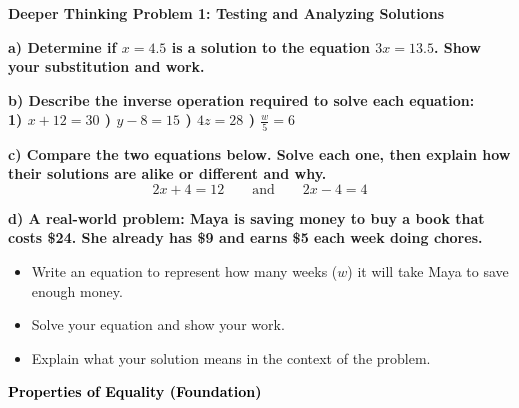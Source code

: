 \documentclass[12pt, letterpaper, fleqn]{article}
\begin{document}
\vspace{2mm}

\begin{tcolorbox}[colback=white, colframe=black, boxrule=1pt, arc=4mm, left=6mm, right=6mm, top=5mm, bottom=5mm]
\textbf{Deeper Thinking Problem 1: Testing and Analyzing Solutions}
\medskip
\noindent

\textbf{a) Determine if $x = 4.5$ is a solution to the equation $3x = 13.5$. Show your substitution and work.}
\vspace{2cm}
\noindent

\textbf{b) Describe the inverse operation required to solve each equation: \\
1) $x + 12 = 30$ \quad {}) $y - 8 = 15$ \quad {}) $4z = 28$ \quad {}) $\frac{w}{5} = 6$}
\vspace{2cm}
\noindent

\textbf{c) Compare the two equations below. Solve each one, then explain how their solutions are alike or different and why.}
\[
2x + 4 = 12 \qquad \text{and} \qquad 2x - 4 = 4
\]
\vspace{3cm}

\noindent
\textbf{d) A real-world problem: Maya is saving money to buy a book that costs \$24. She already has \$9 and earns \$5 each week doing chores.}
\begin{itemize}
    \item Write an equation to represent how many weeks ($w$) it will take Maya to save enough money.
    \item Solve your equation and show your work.
    \item Explain what your solution means in the context of the problem.
\end{itemize}
\vspace{3cm}
\end{tcolorbox}
\newpage

\begin{tcolorbox}[colback=black!10]
    \large\textcolor{black}{\textbf{Properties of Equality (Foundation)}}
\end{tcolorbox}

\vspace{3mm}
\end{document}
